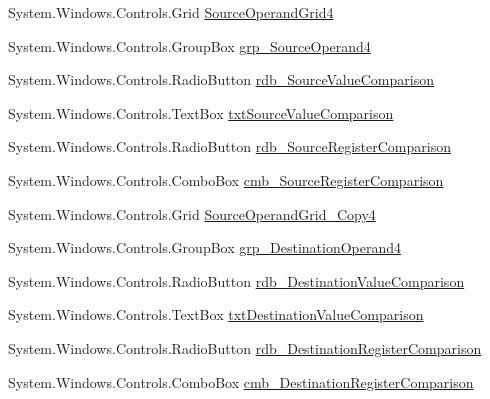 \begin{DoxyCompactItemize}
\item 
System.\+Windows.\+Controls.\+Grid \hyperlink{class_c_p_u___o_s___simulator_1_1_instructions_window_ac28180235c174caa7a2870120a9258bb}{Source\+Operand\+Grid4}
\item 
System.\+Windows.\+Controls.\+Group\+Box \hyperlink{class_c_p_u___o_s___simulator_1_1_instructions_window_a0efec3cdad460e3596a699716e0a24e9}{grp\+\_\+\+Source\+Operand4}
\item 
System.\+Windows.\+Controls.\+Radio\+Button \hyperlink{class_c_p_u___o_s___simulator_1_1_instructions_window_a6232aa7952b3d4ea71c55eb14267f188}{rdb\+\_\+\+Source\+Value\+Comparison}
\item 
System.\+Windows.\+Controls.\+Text\+Box \hyperlink{class_c_p_u___o_s___simulator_1_1_instructions_window_a8dd17881b7fd4e1923899b5bcae171fc}{txt\+Source\+Value\+Comparison}
\item 
System.\+Windows.\+Controls.\+Radio\+Button \hyperlink{class_c_p_u___o_s___simulator_1_1_instructions_window_afa2620b93d7d354b0632d7c290022545}{rdb\+\_\+\+Source\+Register\+Comparison}
\item 
System.\+Windows.\+Controls.\+Combo\+Box \hyperlink{class_c_p_u___o_s___simulator_1_1_instructions_window_af7acb32053b1cf27ee94bbf47efc9fbe}{cmb\+\_\+\+Source\+Register\+Comparison}
\item 
System.\+Windows.\+Controls.\+Grid \hyperlink{class_c_p_u___o_s___simulator_1_1_instructions_window_aa8c70305e3c77644ac312df74b0696b7}{Source\+Operand\+Grid\+\_\+\+Copy4}
\item 
System.\+Windows.\+Controls.\+Group\+Box \hyperlink{class_c_p_u___o_s___simulator_1_1_instructions_window_a68c2f892a54f7826baacf9c828431fa8}{grp\+\_\+\+Destination\+Operand4}
\item 
System.\+Windows.\+Controls.\+Radio\+Button \hyperlink{class_c_p_u___o_s___simulator_1_1_instructions_window_a200445a2378fddf69041aecbbcdf68fb}{rdb\+\_\+\+Destination\+Value\+Comparison}
\item 
System.\+Windows.\+Controls.\+Text\+Box \hyperlink{class_c_p_u___o_s___simulator_1_1_instructions_window_ab44686bd174144a0c1042579d6665547}{txt\+Destination\+Value\+Comparison}
\item 
System.\+Windows.\+Controls.\+Radio\+Button \hyperlink{class_c_p_u___o_s___simulator_1_1_instructions_window_af5369f91639cf92cbb6bd89118d6e373}{rdb\+\_\+\+Destination\+Register\+Comparison}
\item 
System.\+Windows.\+Controls.\+Combo\+Box \hyperlink{class_c_p_u___o_s___simulator_1_1_instructions_window_af209ebdcd0b9ae6c267388b382dac245}{cmb\+\_\+\+Destination\+Register\+Comparison}

\end{DoxyCompactItemize}
